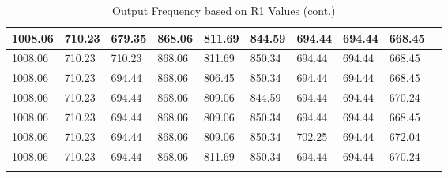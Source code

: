 \begin{longtable}{|l|l|l|l|l|l|l|l|l|l|}
		1008.06  & 710.23  & 679.35  & 868.06   & 811.69 & 844.59   & 694.44  & 694.44  & 668.45  \\ \hline
		1008.06  & 710.23  & 710.23  & 868.06   & 811.69 & 850.34   & 694.44  & 694.44  & 668.45  \\ \hline
		1008.06  & 710.23  & 694.44  & 868.06   & 806.45 & 850.34   & 694.44  & 694.44  & 668.45  \\ \hline
		1008.06  & 710.23  & 694.44  & 868.06   & 809.06 & 844.59   & 694.44  & 694.44  & 670.24  \\ \hline
		1008.06  & 710.23  & 694.44  & 868.06   & 809.06 & 850.34   & 694.44  & 694.44  & 668.45  \\ \hline
		1008.06  & 710.23  & 694.44  & 868.06   & 809.06 & 850.34   & 702.25  & 694.44  & 672.04  \\ \hline
		1008.06  & 710.23  & 694.44  & 868.06   & 811.69 & 850.34   & 694.44  & 694.44  & 670.24  \\ \hline
		\caption{Output Frequency based on R1 Values (cont.)}
		\label{calibrationtable2}
	\end{longtable}
	
